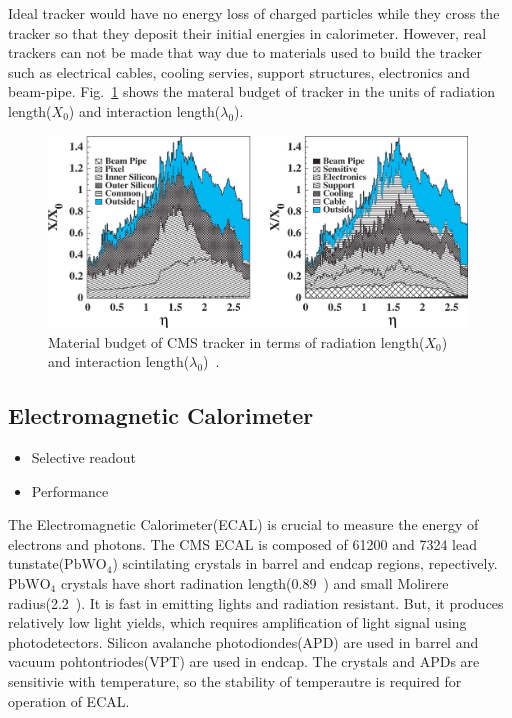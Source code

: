 Ideal tracker would have no energy loss of charged particles 
while they cross the tracker so that they deposit their initial 
energies in calorimeter. However, real trackers can not be made 
that way due to materials used to build the tracker such as 
electrical cables, cooling servies, support structures, 
electronics and beam-pipe. Fig.~\ref{fig:trackermaterial} shows 
the materal budget of tracker in the units of radiation length($X_0$) 
and interaction length($\lambda_0$). 
%
\begin{figure}[ht!] 
\vspace{1cm}
\centering 
\includegraphics[width=0.99\textwidth]{figures/trackermaterial.jpeg}
\caption{Material budget of CMS tracker in terms of radiation length($X_0$)
and interaction length($\lambda_0$)~\cite{Abbaneo2004331}.} 
\label{fig:trackermaterial} 
\end{figure} 



\subsection{Electromagnetic Calorimeter} 
\begin{itemize}
  \item Selective readout   
  \item Performance  
\end{itemize}

The Electromagnetic Calorimeter(ECAL) is crucial to measure the energy 
of electrons and photons. The CMS ECAL is composed of 61200 and 7324 
lead tunstate($\textrm{PbWO}_4$) scintilating crystals in barrel and 
endcap regions, repectively. $\textrm{PbWO}_4$ crystals have short 
radination length(0.89~\cm) and small Molirere radius(2.2~\cm). 
It is fast in emitting lights and radiation resistant. 
But, it produces relatively low light yields, which requires amplification 
of light signal using photodetectors. Silicon avalanche photodiondes(APD)
are used in barrel and vacuum pohtontriodes(VPT) are used in endcap.
The crystals and APDs are sensitivie with temperature, so the stability
of temperautre is required for operation of ECAL. 

